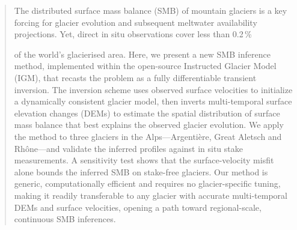 \begin{abstract}
The distributed surface mass balance (SMB) of mountain glaciers is a key forcing for glacier evolution and subsequent meltwater availability projections. Yet, direct in situ observations cover 
less than 0.2\,\% 

of the world's glacierised area. Here, we present a new SMB inference method, implemented within the open-source Instructed Glacier Model (IGM), that recasts the problem as 
a fully differentiable transient inversion. 
The inversion scheme uses observed surface velocities to initialize a dynamically consistent glacier model, then inverts multi-temporal surface elevation changes (DEMs) to estimate the spatial distribution of surface mass balance that best explains the observed glacier evolution.  We apply the method to three glaciers in the Alps---Argentière, Great Aletsch and Rhône---and validate the inferred profiles against in situ stake measurements. A sensitivity test shows that the surface-velocity misfit alone bounds the inferred SMB on stake-free glaciers. Our method is generic, computationally efficient and requires no glacier-specific tuning, making it readily transferable to any glacier with accurate multi-temporal DEMs and surface velocities, opening a path toward regional-scale, continuous SMB inferences.
\end{abstract}